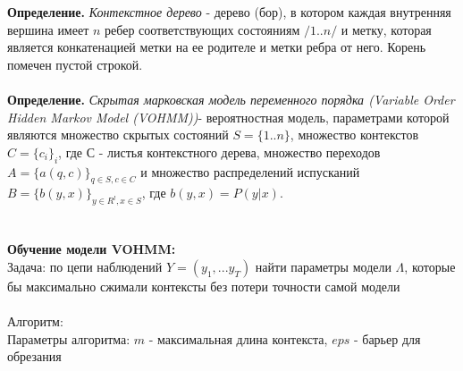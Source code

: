 \documentclass[10pt,a4paper]{article}
\begin{document}
\textbf{Определение.} \textit{Контекстное дерево} - дерево (бор), в котором каждая внутренняя вершина имеет $ n $ ребер соответствующих состояниям $ /{1..n/} $ и метку, которая является конкатенацией метки на ее родителе и метки ребра от него. Корень помечен пустой строкой. 
\\\\
\textbf{Определение.} \textit{Скрытая марковская модель переменного порядка (Variable Order Hidden Markov Model (VOHMM))}- вероятностная модель, параметрами которой являются множество скрытых состояний $ S = \{1..n\} $, множество контекстов $ C=\{c_{i}\}_{i} $, где $ С $ - листья контекстного дерева, множество переходов $ A = \{a(q, c)\}_{q \in S, c \in C}$ и множество распределений испусканий $ B = \{b(y,x)\}_{y \in R^{l}, x \in S}$, где $ b(y, x) = P(y|x)$.  
\\\\\\
\textbf{Обучение модели VOHMM:}
\\
{\large Задача:} по цепи наблюдений $ Y = (y_{1}, ... y_{T}) $ найти параметры модели $ \Lambda$, 
которые бы максимально сжимали контексты без потери точности самой модели 
\\\\
{\large Алгоритм:}
\\
Параметры алгоритма: $ m $ - максимальная длина контекста, $ eps $ - барьер для обрезания
\\
\end{document}
